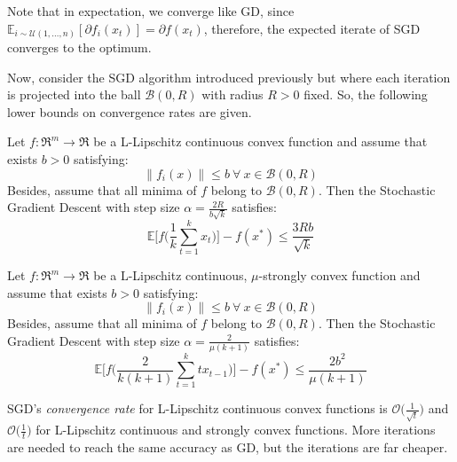 Note that in expectation, we converge like GD, since $\displaystyle \mathbb{E}_{i \sim \mathcal{U}(1,\dots,n)}[\partial f_i(x_t)] = \partial f(x_t)$, therefore, the expected iterate of SGD converges to the optimum.


Now, consider the SGD algorithm introduced previously but where each iteration is projected into the ball $\mathcal{B}(0, R)$ with radius $R > 0$ fixed. So, the following lower bounds on convergence rates are given.

\begin{theorem}[\href{https://erwanscornet.github.io/teaching/Optimization.pdf\#page=62}{Stochastic Gradient Descent convergence for convex functions}] \label{thm:cvx_sgd_convergence}
Let $f: \Re^m \rightarrow \Re$ be a L-Lipschitz continuous convex function and assume that exists $b > 0$ satisfying:
$$
\| f_i(x) \| \leq b \ \forall \ x \in \mathcal{B}(0, R)
$$
Besides, assume that all minima of $f$ belong to $\mathcal{B}(0, R)$. Then the Stochastic Gradient Descent with step size $\displaystyle \alpha = \frac{2R}{b\sqrt{k}}$ satisfies:
$$
\mathbb{E}\Bigg[f\Bigg(\frac{1}{k} \sum_{t=1}^k x_t\Bigg)\Bigg] - f(x^*) \leq \frac{3Rb}{\sqrt{k}}
$$
\end{theorem}

\begin{theorem}[\href{https://erwanscornet.github.io/teaching/Optimization.pdf\#page=63}{Stochastic Gradient Descent convergence for strongly convex functions}] \label{thm:str_cvx_sgd_convergence}
Let $f: \Re^m \rightarrow \Re$ be a L-Lipschitz continuous, $\mu$-strongly convex function and assume that exists $b > 0$ satisfying:
$$
\| f_i(x) \| \leq b \ \forall \ x \in \mathcal{B}(0, R)
$$
Besides, assume that all minima of $f$ belong to $\mathcal{B}(0, R)$. Then the Stochastic Gradient Descent with step size $\displaystyle \alpha = \frac{2}{\mu(k+1)}$ satisfies:
$$
\mathbb{E}\Bigg[f\Bigg(\frac{2}{k(k+1)} \sum_{t=1}^k t x_{t-1}\Bigg)\Bigg] - f(x^*) \leq \frac{2b^2}{\mu(k+1)}
$$
\end{theorem}

SGD’s \emph{convergence rate} for L-Lipschitz continuous convex functions is $\displaystyle \mathcal{O}\bigg(\frac{1}{\sqrt{t}}\bigg)$ and $\displaystyle \mathcal{O}\bigg(\frac{1}{t}\bigg)$ for L-Lipschitz continuous and strongly convex functions. More iterations are needed to reach the same accuracy as GD, but the iterations are far cheaper.

